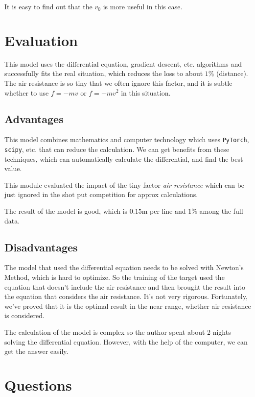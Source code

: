 \documentclass{article}
\begin{document}
It is easy to find out that the $v_0$ is more useful in this case.

\section{Evaluation}

This model uses the differential equation, gradient descent, etc. algorithms and successfully fits the real situation, which reduces the loss to about $1\%$ (distance). The air resistance is so tiny that we often ignore this factor, and it is subtle whether to use $f=-mv$ or $f=-mv^2$ in this situation.

\subsection{Advantages}

This model combines mathematics and computer technology which uses \texttt{PyTorch}, \texttt{scipy}, etc. that can reduce the calculation. We can get benefits from these techniques, which can automatically calculate the differential, and find the best value.

This module evaluated the impact of the tiny factor \textit{air resistance} which can be just ignored in the shot put competition for approx calculations.

The result of the model is good, which is $0.15\si{\meter}$ per line and $1\%$ among the full data.

\subsection{Disadvantages}

The model that used the differential equation needs to be solved with Newton's Method, which is hard to optimize. So the training of the target used the equation that doesn't include the air resistance and then brought the result into the equation that considers the air resistance. It's not very rigorous. Fortunately, we've proved that it is the optimal result in the near range, whether air resistance is considered.

The calculation of the model is complex so the author spent about 2 nights solving the differential equation. However, with the help of the computer, we can get the answer easily.

\section{Questions}
\end{document}

